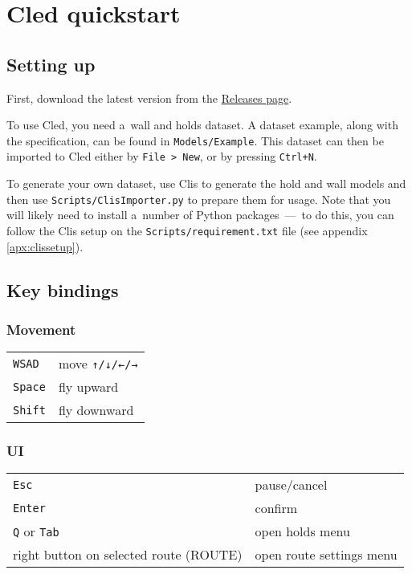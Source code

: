 \chapter{Cled quickstart}\label{apx:cled}

\section{Setting up}
First, download the latest version from the \href{https://github.com/Climber-Tools/Cled/releases}{Releases page}.

To use Cled, you need a~wall and holds dataset.
A dataset example, along with the specification, can be found in \verb|Models/Example|.
This dataset can then be imported to Cled either by \verb|File > New|, or by pressing
\verb|Ctrl+N|.

To generate your own dataset, use Clis \cite{clis} to generate the hold and wall models and then use \verb|Scripts/ClisImporter.py| to prepare them for usage.
Note that you will likely need to install a~number of Python packages~---~to do this, you can follow the Clis setup on the \verb|Scripts/requirement.txt| file (see appendix \ref{apx:clissetup}).

\section{Key bindings}

\subsection{Movement}

\begin{tabular}[]{@{}ll@{}}
\toprule
\verb|WSAD| & move \verb|↑/↓/←/→| \\
\verb|Space| & fly upward \\
\verb|Shift| & fly downward \\
\bottomrule
\end{tabular}

\subsection{UI}

\begin{tabular}[]{@{}ll@{}}
\toprule
\verb|Esc| & pause/cancel \\
\verb|Enter| & confirm \\
\verb|Q| or \verb|Tab| & open holds menu \\
right button on selected route (ROUTE) & open route settings menu \\
\bottomrule
\end{tabular}

